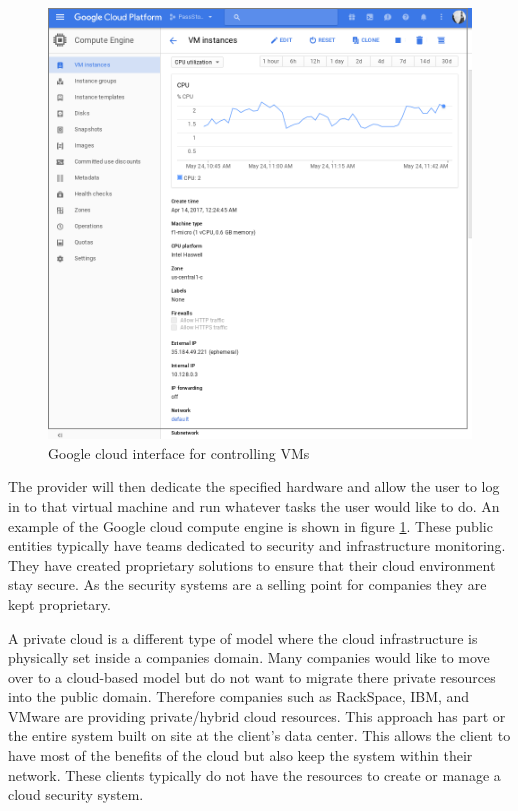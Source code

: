 \documentclass[12pt]{article}
\begin{document}
\begin{figure}[ht]
    \centering
    \includegraphics[scale=.3]{./pic/2017-05-24-114324_946x962_scrot.png}
    \caption{Google cloud interface for controlling VMs}
    \label{fig:GoogleInterface}
\end{figure}

The provider will then dedicate the specified hardware and allow the user to log in to that virtual machine and run whatever tasks the user would like to do. An example of the Google cloud compute engine is shown in figure \ref{fig:GoogleInterface}.  These public entities typically have teams dedicated to security and infrastructure monitoring. They have created proprietary solutions to ensure that their cloud environment \cite{SecAmazon} stay secure. As the security systems are a selling point for companies they are kept proprietary.

A private cloud is a different type of model where the cloud infrastructure is physically set inside a companies domain. Many companies would like to move over to a cloud-based model but do not want to migrate there private resources into the public domain. Therefore companies such as RackSpace, IBM, and VMware are providing private/hybrid cloud resources. This approach has part or the entire system built on site at the client's data center. This allows the client to have most of the benefits of the cloud but also keep the system within their network. These clients typically do not have the resources to create or manage a cloud security system.
\end{document}
